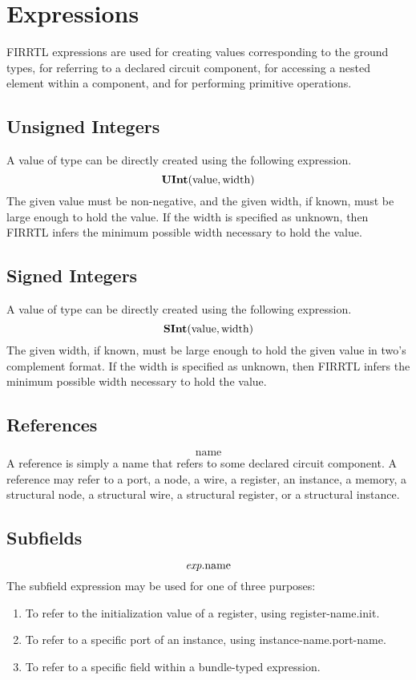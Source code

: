 \documentclass[12pt]{article}
\begin{document}
\section{Expressions}

FIRRTL expressions are used for creating values corresponding to the ground types, for referring to a declared circuit component, for accessing a nested element within a component, and for performing primitive operations. 

\subsection{Unsigned Integers}

A value of type  can be directly created using the following expression.
\[
\text{\bf UInt}(\text{value}, \text{width})
\]
The given value must be non-negative, and the given width, if known, must be large enough to hold the value. If the width is specified as unknown, then FIRRTL infers the minimum possible width necessary to hold the value.

\subsection{Signed Integers}

A value of type  can be directly created using the following expression.
\[
\text{\bf SInt}(\text{value}, \text{width})
\]
The given width, if known, must be large enough to hold the given value in two's complement format. If the width is specified as unknown, then FIRRTL infers the minimum possible width necessary to hold the value.

\subsection{References}
\[
\text{name}
\]
A reference is simply a name that refers to some declared circuit component. A reference may refer to a port, a node, a wire, a register, an instance, a memory, a structural node, a structural wire, a structural register, or a structural instance.

\subsection{Subfields}
\[
\text{\em exp}.\text{name}
\]
The subfield expression may be used for one of three purposes:
\begin{enumerate}
\item To refer to the initialization value of a register, using register-name.init.
\item To refer to a specific port of an instance, using instance-name.port-name. 
\item To refer to a specific field within a bundle-typed expression.
\end{enumerate}
\end{document}
